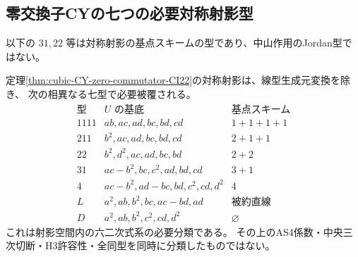 \subsection{零交換子CYの七つの必要対称射影型}
\label{subsec:cubic-CY-CI22-projection-atlas}
以下の $31,22$ 等は対称射影の基点スキームの型であり、中山作用のJordan型ではない。
\begin{theorem}\label{thm:cubic-CY-CI22-seven-projections}
定理\ref{thm:cubic-CY-zero-commutator-CI22}の対称射影は、線型生成元変換を除き、
次の相異なる七型で必要被覆される。
\[
\begin{array}{c|l|c}
\text{型}&U\text{ の基底}&\text{基点スキーム}\\\hline
1111&ab,ac,ad,bc,bd,cd&1+1+1+1\\
211&b^2,ac,ad,bc,bd,cd&2+1+1\\
22&b^2,d^2,ac,ad,bc,bd&2+2\\
31&ac-b^2,bc,c^2,ad,bd,cd&3+1\\
4&ac-b^2,ad-bc,bd,c^2,cd,d^2&4\\
L&a^2,ab,b^2,bc,ac-bd,ad&\text{被約直線}\\
D&a^2,ab,b^2,c^2,cd,d^2&\varnothing
\end{array}
\]
これは射影空間内の六二次式系の必要分類である。
その上のAS4係数・中央三次切断・H3許容性・全同型を同時に分類したものではない。
\end{theorem}
